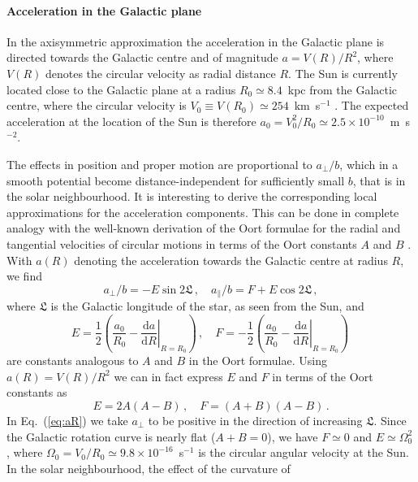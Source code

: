 \documentclass{aa}
\newcommand{\glon}{\mathfrak{L}}
\begin{document}
\paragraph{Acceleration in the Galactic plane}
In the axisymmetric approximation the acceleration in the Galactic plane
is directed towards the Galactic centre and of magnitude $a=V(R)/R^2$, where $V(R)$
denotes the circular velocity as radial distance $R$. The Sun
is currently located close to the Galactic plane at a radius $R_0\simeq 8.4$~kpc from the
Galactic centre, where the circular velocity is $V_0\equiv V(R_0)\simeq 254$~km~s$^{-1}$
\citep{reid+2009}. The expected acceleration at the location of the Sun is therefore
$a_0=V_0^2/R_0\simeq 2.5\times 10^{-10}$~m~s$^{-2}$.

The effects in position and proper motion are proportional to $a_\perp/b$, which in a smooth
potential become distance-independent for sufficiently small $b$, that is in the solar neighbourhood.
It is interesting to derive the corresponding local approximations for the acceleration components.
This can be done in complete analogy with the well-known derivation of the Oort formulae for
the radial and tangential velocities of circular motions in terms of the Oort constants $A$ and $B$
\citep[e.g.][]{bm1998}. With $a(R)$ denoting the acceleration towards the Galactic centre
at radius $R$, we find
\begin{equation}\label{eq:aR}
a_\perp/b = -E\sin 2\glon \, , \quad
a_\parallel/b = F + E\cos 2\glon \, ,
\end{equation}
where $\glon$ is the Galactic longitude of the star, as seen from the Sun, and
\begin{equation}
E = \frac{1}{2}\left( \frac{a_0}{R_0} - \left.\frac{\text{d}a}{\text{d}R}\right|_{R=R_0}\right) \, , \quad
F = -\frac{1}{2}\left( \frac{a_0}{R_0} - \left.\frac{\text{d}a}{\text{d}R}\right|_{R=R_0}\right) \,
\end{equation}
are constants analogous to $A$ and $B$ in the Oort formulae. Using $a(R)=V(R)/R^2$ we can in fact
express $E$ and $F$ in terms of the Oort constants as
\begin{equation}
E =  2A(A-B)\, , \quad
F =  (A+B)(A-B) \, .
\end{equation}
In Eq.~(\ref{eq:aR}) we take $a_\perp$ to be positive in the direction of increasing $\glon$.
Since the Galactic rotation curve is nearly flat ($A+B=0$), we have $F\simeq 0$ and
$E\simeq\Omega_0^2$, where $\Omega_0=V_0/R_0\simeq 9.8\times 10^{-16}$~s$^{-1}$ is the
circular angular velocity at the Sun. In the solar neighbourhood, the effect of the curvature of
\end{document}
